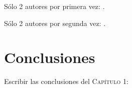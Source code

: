 Sólo 2 autores por primera vez: \citep{kamboj2014physicochemical}.

Sólo 2 autores por segunda vez: \citep{kamboj2014physicochemical}.



\section{Conclusiones}
Escribir las conclusiones del \textsc{Capítulo 1}: \lipsum[2]


\begin{refcontext}[sorting=nyt]
\printbibliography[title={Referencias}, heading=subbibintoc]
\end{refcontext}
